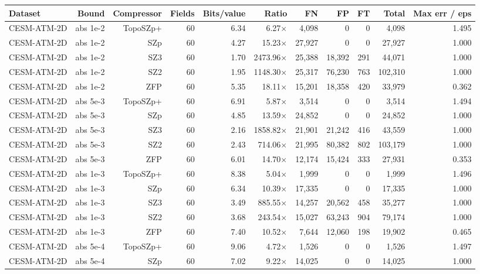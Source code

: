 \begin{tabular}{lrrrrrrrrrr}
\toprule
\textbf{Dataset} & \textbf{Bound} & \textbf{Compressor} & \textbf{Fields} & \textbf{Bits/value} & \textbf{Ratio} & \textbf{FN} & \textbf{FP} & \textbf{FT} & \textbf{Total} & \textbf{Max err / eps} \\
\midrule
CESM-ATM-2D & abs 1e-2 & TopoSZp+ & 60 & 6.34 & 6.27$\times$ & 4,098 & 0 & 0 & 4,098 & 1.495 \\
CESM-ATM-2D & abs 1e-2 & SZp & 60 & 4.27 & 15.23$\times$ & 27,927 & 0 & 0 & 27,927 & 1.000 \\
CESM-ATM-2D & abs 1e-2 & SZ3 & 60 & 1.70 & 2473.96$\times$ & 25,388 & 18,392 & 291 & 44,071 & 1.000 \\
CESM-ATM-2D & abs 1e-2 & SZ2 & 60 & 1.95 & 1148.30$\times$ & 25,317 & 76,230 & 763 & 102,310 & 1.000 \\
CESM-ATM-2D & abs 1e-2 & ZFP & 60 & 5.35 & 18.11$\times$ & 15,201 & 18,358 & 420 & 33,979 & 0.362 \\
CESM-ATM-2D & abs 5e-3 & TopoSZp+ & 60 & 6.91 & 5.87$\times$ & 3,514 & 0 & 0 & 3,514 & 1.494 \\
CESM-ATM-2D & abs 5e-3 & SZp & 60 & 4.85 & 13.59$\times$ & 24,852 & 0 & 0 & 24,852 & 1.000 \\
CESM-ATM-2D & abs 5e-3 & SZ3 & 60 & 2.16 & 1858.82$\times$ & 21,901 & 21,242 & 416 & 43,559 & 1.000 \\
CESM-ATM-2D & abs 5e-3 & SZ2 & 60 & 2.43 & 714.06$\times$ & 21,995 & 80,382 & 802 & 103,179 & 1.000 \\
CESM-ATM-2D & abs 5e-3 & ZFP & 60 & 6.01 & 14.70$\times$ & 12,174 & 15,424 & 333 & 27,931 & 0.353 \\
CESM-ATM-2D & abs 1e-3 & TopoSZp+ & 60 & 8.38 & 5.04$\times$ & 1,999 & 0 & 0 & 1,999 & 1.496 \\
CESM-ATM-2D & abs 1e-3 & SZp & 60 & 6.34 & 10.39$\times$ & 17,335 & 0 & 0 & 17,335 & 1.000 \\
CESM-ATM-2D & abs 1e-3 & SZ3 & 60 & 3.49 & 885.55$\times$ & 14,257 & 20,562 & 458 & 35,277 & 1.000 \\
CESM-ATM-2D & abs 1e-3 & SZ2 & 60 & 3.68 & 243.54$\times$ & 15,027 & 63,243 & 904 & 79,174 & 1.000 \\
CESM-ATM-2D & abs 1e-3 & ZFP & 60 & 7.40 & 10.52$\times$ & 7,644 & 12,060 & 198 & 19,902 & 0.465 \\
CESM-ATM-2D & abs 5e-4 & TopoSZp+ & 60 & 9.06 & 4.72$\times$ & 1,526 & 0 & 0 & 1,526 & 1.497 \\
CESM-ATM-2D & abs 5e-4 & SZp & 60 & 7.02 & 9.22$\times$ & 14,025 & 0 & 0 & 14,025 & 1.000 \\

\end{tabular}
